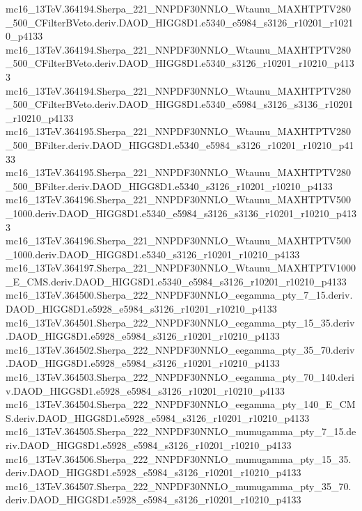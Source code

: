 mc16_13TeV.364194.Sherpa_221_NNPDF30NNLO_Wtaunu_MAXHTPTV280_500_CFilterBVeto.deriv.DAOD_HIGG8D1.e5340_e5984_s3126_r10201_r10210_p4133 \\
mc16_13TeV.364194.Sherpa_221_NNPDF30NNLO_Wtaunu_MAXHTPTV280_500_CFilterBVeto.deriv.DAOD_HIGG8D1.e5340_s3126_r10201_r10210_p4133 \\
mc16_13TeV.364194.Sherpa_221_NNPDF30NNLO_Wtaunu_MAXHTPTV280_500_CFilterBVeto.deriv.DAOD_HIGG8D1.e5340_e5984_s3126_s3136_r10201_r10210_p4133 \\
mc16_13TeV.364195.Sherpa_221_NNPDF30NNLO_Wtaunu_MAXHTPTV280_500_BFilter.deriv.DAOD_HIGG8D1.e5340_e5984_s3126_r10201_r10210_p4133 \\
mc16_13TeV.364195.Sherpa_221_NNPDF30NNLO_Wtaunu_MAXHTPTV280_500_BFilter.deriv.DAOD_HIGG8D1.e5340_s3126_r10201_r10210_p4133 \\
mc16_13TeV.364196.Sherpa_221_NNPDF30NNLO_Wtaunu_MAXHTPTV500_1000.deriv.DAOD_HIGG8D1.e5340_e5984_s3126_s3136_r10201_r10210_p4133 \\
mc16_13TeV.364196.Sherpa_221_NNPDF30NNLO_Wtaunu_MAXHTPTV500_1000.deriv.DAOD_HIGG8D1.e5340_s3126_r10201_r10210_p4133 \\
mc16_13TeV.364197.Sherpa_221_NNPDF30NNLO_Wtaunu_MAXHTPTV1000_E_CMS.deriv.DAOD_HIGG8D1.e5340_e5984_s3126_r10201_r10210_p4133 \\
mc16_13TeV.364500.Sherpa_222_NNPDF30NNLO_eegamma_pty_7_15.deriv.DAOD_HIGG8D1.e5928_e5984_s3126_r10201_r10210_p4133 \\
mc16_13TeV.364501.Sherpa_222_NNPDF30NNLO_eegamma_pty_15_35.deriv.DAOD_HIGG8D1.e5928_e5984_s3126_r10201_r10210_p4133 \\
mc16_13TeV.364502.Sherpa_222_NNPDF30NNLO_eegamma_pty_35_70.deriv.DAOD_HIGG8D1.e5928_e5984_s3126_r10201_r10210_p4133 \\
mc16_13TeV.364503.Sherpa_222_NNPDF30NNLO_eegamma_pty_70_140.deriv.DAOD_HIGG8D1.e5928_e5984_s3126_r10201_r10210_p4133 \\
mc16_13TeV.364504.Sherpa_222_NNPDF30NNLO_eegamma_pty_140_E_CMS.deriv.DAOD_HIGG8D1.e5928_e5984_s3126_r10201_r10210_p4133 \\
mc16_13TeV.364505.Sherpa_222_NNPDF30NNLO_mumugamma_pty_7_15.deriv.DAOD_HIGG8D1.e5928_e5984_s3126_r10201_r10210_p4133 \\
mc16_13TeV.364506.Sherpa_222_NNPDF30NNLO_mumugamma_pty_15_35.deriv.DAOD_HIGG8D1.e5928_e5984_s3126_r10201_r10210_p4133 \\
mc16_13TeV.364507.Sherpa_222_NNPDF30NNLO_mumugamma_pty_35_70.deriv.DAOD_HIGG8D1.e5928_e5984_s3126_r10201_r10210_p4133 \\
